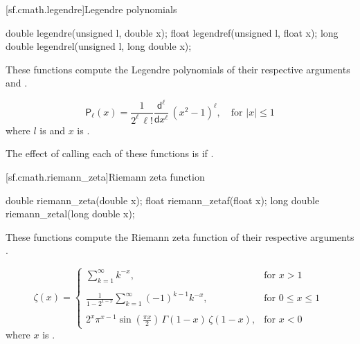 [sf.cmath.legendre]{Legendre polynomials}%
%
%
%
%
%
\begin{itemdecl}
double       legendre(unsigned l, double x);
float        legendref(unsigned l, float x);
long double  legendrel(unsigned l, long double x);
\end{itemdecl}

\begin{itemdescr}

\pnum\effects
These functions compute the Legendre polynomials of their
respective arguments
 and .

\pnum\returns
\[%
  \mathsf{P}_\ell(x) =
  \frac{1}
       {2^\ell \, \ell!}
  \frac{ \mathsf{d} ^ \ell}
       { \mathsf{d}x ^ \ell} \, (x^2 - 1) ^ \ell,
	   \quad \mbox{for $|x| \le 1$}
\]
where
$l$ is  and
$x$ is .

\pnum\remark
The effect of calling each of these functions
is 
if .
\end{itemdescr}

[sf.cmath.riemann_zeta]{Riemann zeta function}%
%
%
%
%
\begin{itemdecl}
double       riemann_zeta(double x);
float        riemann_zetaf(float x);
long double  riemann_zetal(long double x);
\end{itemdecl}

\begin{itemdescr}

\pnum\effects
These functions compute the Riemann zeta function
of their respective arguments
.

\pnum\returns
\[%
  \mathsf{\zeta}(x) =
  \left\{
  \begin{array}{cl}
  \displaystyle
  \sum_{k=1}^\infty k^{-x},
  & \mbox{for $x > 1$}
  \\
  \\
  \displaystyle
  \frac{1}
	{1 - 2^{1-x}}
  \sum_{k=1}^\infty (-1)^{k-1} k^{-x},
  & \mbox{for $0 \le x \le 1$}
  \\
  \\
  \displaystyle
  2^x \pi^{x-1} \sin(\frac{\pi x}{2}) \, \Gamma(1-x) \, \zeta(1-x),
  & \mbox{for $x < 0$}
  \end{array}
  \right.
\;
\]
where
$x$ is .
\end{itemdescr}


